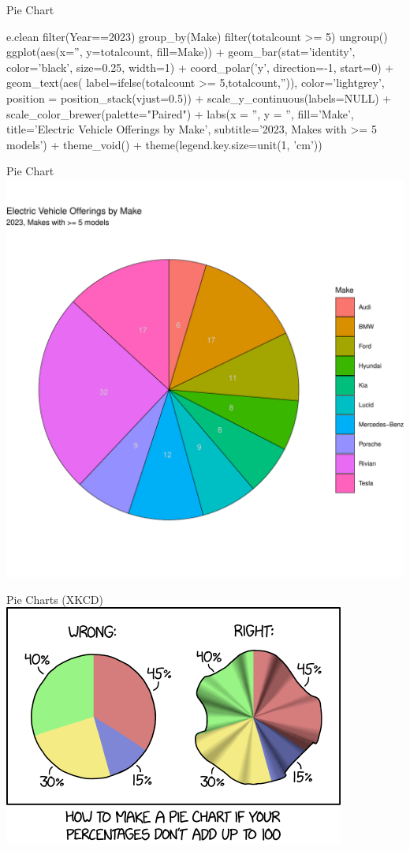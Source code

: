 \documentclass[ignorenonframetext,xcolor=x11names]{beamer}
\begin{document}
\begin{frame}[fragile]{Pie Chart}
\footnotesize
\begin{Rcode}
e.clean %
  filter(Year==2023) %
  group_by(Make) %
  filter(totalcount >= 5) %
  ungroup() %
ggplot(aes(x='', y=totalcount, fill=Make)) +
  geom_bar(stat='identity', 
           color='black', size=0.25, width=1) + 
  coord_polar('y', direction=-1, start=0) +
  geom_text(aes(
     label=ifelse(totalcount >= 5,totalcount,'')), 
     color='lightgrey', 
     position = position_stack(vjust=0.5)) +
  scale_y_continuous(labels=NULL) + 
  scale_color_brewer(palette="Paired") +
  labs(x = '', y = '',  fill='Make', 
       title='Electric Vehicle Offerings by Make', 
       subtitle='2023, Makes with >= 5 models') +
  theme_void() +
  theme(legend.key.size=unit(1, 'cm'))
\end{Rcode}
\end{frame}

\begin{frame}{Pie Chart}
\centering
  \includegraphics[width=.8\textwidth]{fuel.pie.pdf}
\end{frame}


\begin{frame}{Pie Charts (XKCD)}
  \includegraphics[width=\textwidth]{xkcd_pie_charts.png}
\end{frame}
\end{document}
